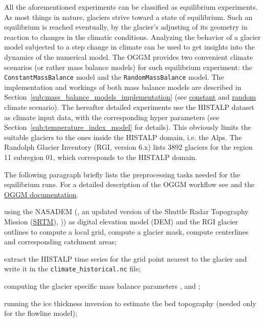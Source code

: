     All the aforementioned experiments can be classified as equilibrium experiments. As most things in nature, glaciers strive toward a state of equilibrium. Such an equilibrium is reached eventually, by the glacier's adjusting of its geometry in reaction to changes in the climatic conditions. Analyzing the behavior of a glacier model subjected to a step change in climate can be used to get insights into the dynamics of the numerical model. The OGGM provides two convenient climate scenarios (or rather mass balance models) for such equilibrium experiment: the \lstinline`ConstantMassBalance` model and the \lstinline`RandomMassBalance` model. The implementation and workings of both mass balance models are described in Section~\ref{sub:mass_balance_models_implementation} (see \hyperref[ssub:constant_climate_scenario_implementation]{constant} and \hyperref[ssub:random_climate_scenario_implementation]{random} climate scenario).
    The hereafter detailed experiments use the HISTALP dataset \citep{Auer2007} as climate input data, with the corresponding hyper parameters (see Section~\ref{sub:temperature_index_model} for details).
    This obviously limits the suitable glaciers to the ones inside the HISTALP domain, i.e. the Alps. The Randolph Glacier Inventory (RGI, version 6.x) \citep{RGI2017,Pfeffer2014} lists 3892 glaciers for the region 11 subregion 01, which corresponds to the HISTALP domain.

    The following paragraph briefly lists the preprocessing tasks needed for the equilibrium runs. For a detailed description of the OGGM workflow see \citet{Maussion2019} and the \href{https://docs.oggm.org}{OGGM documentation}.
    \begin{description}[noitemsep]
        \item[GIS tasks:] using the NASADEM (\citet{NASADEM2020}, an updated version of the Shuttle Radar Topography Mission (\href{http://srtm.csi.cgiar.org/}{SRTM}), \citet{Jarvis2008})) as digital elevation model (DEM) and the RGI glacier outlines to compute a local grid, compute a glacier mask, compute centerlines and corresponding catchment areas;
        \item[climate tasks:] extract the HISTALP time series for the grid point nearest to the glacier and write it in the \lstinline`climate_historical.nc` file;
        \item[mass balance calibration:] computing the glacier specific mass balance parameters \tstar{}, \mustar{} and \bias{};
        \item[inversion tasks:] running the ice thickness inversion to estimate the bed topography (needed only for the flowline model);
    \end{description}

